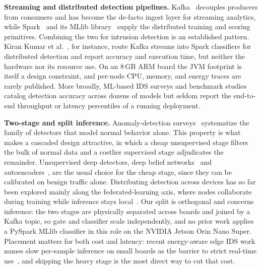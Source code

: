 \documentclass[runningheads]{llncs}
\begin{document}
\textbf{Streaming and distributed detection pipelines.} Kafka~\cite{kreps2011kafka} decouples producers from consumers and has become the de-facto ingest layer for streaming analytics, while Spark~\cite{zaharia2010spark} and its MLlib library~\cite{meng2016mllib} supply the distributed training and scoring primitives. Combining the two for intrusion detection is an established pattern. Kiran Kumar et al.~\cite{kumar2025kafkaspark}, for instance, route Kafka streams into Spark classifiers for distributed detection and report accuracy and execution time, but neither the hardware nor its resource use. On an 8\,GB ARM board the JVM footprint is itself a design constraint, and per-node CPU, memory, and energy traces are rarely published. More broadly, ML-based IDS surveys and benchmark studies~\cite{khraisat2019survey,ferrag2020deep,vinayakumar2019deep} catalog detection accuracy across dozens of models but seldom report the end-to-end throughput or latency percentiles of a running deployment.

\textbf{Two-stage and split inference.} Anomaly-detection surveys~\cite{chandola2009anomaly,ruff2021unifying} systematize the family of detectors that model normal behavior alone. This property is what makes a cascaded design attractive, in which a cheap unsupervised stage filters the bulk of normal data and a costlier supervised stage adjudicates the remainder. Unsupervised deep detectors, deep belief networks~\cite{alrawashdeh2016toward} and autoencoders~\cite{lopez2017autoencoder,hasan2025iiot}, are the usual choice for the cheap stage, since they can be calibrated on benign traffic alone. Distributing detection across devices has so far been explored mainly along the federated-learning axis, where nodes collaborate during training while inference stays local~\cite{nguyen2019diot,hernandezramos2025federated}. Our split is orthogonal and concerns inference: the two stages are physically separated across boards and joined by a Kafka topic, so gate and classifier scale independently, and no prior work applies a PySpark MLlib classifier in this role on the NVIDIA Jetson Orin Nano Super. Placement matters for both cost and latency: recent energy-aware edge IDS work names slow per-sample inference on small boards as the barrier to strict real-time use~\cite{nassef2026tinyml}, and skipping the heavy stage is the most direct way to cut that cost.
\end{document}
